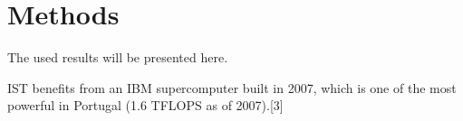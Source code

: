 \section{Methods}
The used results will be presented here.

IST benefits from an IBM supercomputer built in 2007, which is one of the most powerful in Portugal (1.6 TFLOPS as of 2007).[3]


